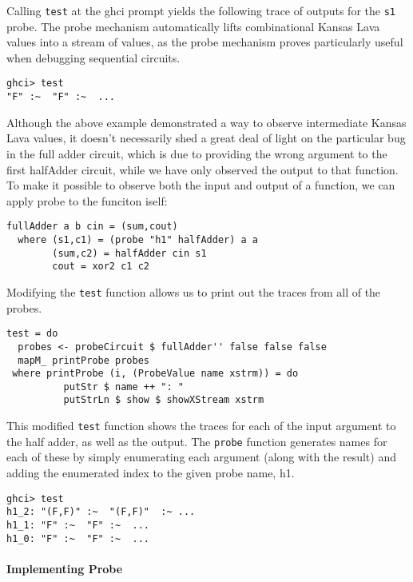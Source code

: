 \documentclass{llncs}
\begin{document}
Calling \verb!test! at the ghci prompt yields the following trace of outputs for
the \texttt{s1} probe. The probe mechanism automatically lifts combinational Kansas Lava
values into a stream of values, as the probe mechanism proves particularly
useful when debugging sequential circuits.

\begin{verbatim}
ghci> test
"F" :~  "F" :~  ...
\end{verbatim}

Although the above example demonstrated a way to observe intermediate Kansas
Lava values, it doesn't necessarily shed a great deal of light on the particular
bug in the full adder circuit, which is due to providing the wrong argument to
the first halfAdder circuit, while we have only observed the output to that
function. To make it possible to observe both the input and output of a
function, we can apply probe to the funciton iself:

\begin{verbatim}
fullAdder a b cin = (sum,cout)
  where (s1,c1) = (probe "h1" halfAdder) a a
        (sum,c2) = halfAdder cin s1
        cout = xor2 c1 c2
\end{verbatim}


Modifying the \verb!test! function allows us to print out the traces from all of
the probes.

\begin{verbatim}
test = do
  probes <- probeCircuit $ fullAdder'' false false false
  mapM_ printProbe probes
 where printProbe (i, (ProbeValue name xstrm)) = do
          putStr $ name ++ ": "
          putStrLn $ show $ showXStream xstrm
\end{verbatim}

This modified \verb!test! function shows the traces for each of the input
argument to the half adder, as well as the output. The \verb!probe! function
generates names for each of these by simply enumerating each argument (along
with the result) and adding the enumerated index to the given probe name, h1.

\begin{verbatim}
ghci> test
h1_2: "(F,F)" :~  "(F,F)"  :~ ...
h1_1: "F" :~  "F" :~  ...
h1_0: "F" :~  "F" :~  ...
\end{verbatim}

\paragraph{Implementing Probe}
\end{document}
